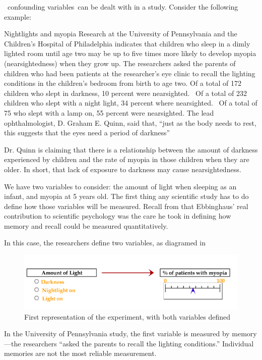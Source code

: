 \begin{refsection}
 confounding variables can be dealt with in a study. Consider the following example:

\begin{apatextbox}{Nightlights and myopia}
Research at the University of Pennsylvania and the Children’s Hospital of Philadelphia indicates that children who sleep in a dimly lighted room until age two may be up to five times more likely to develop myopia (nearsightedness) when they grow up.\newline
The researchers asked the parents of children who had been patients at the researcher’s eye clinic to recall the lighting conditions in the children’s bedroom from birth to age two.\newline
Of a total of 172 children who slept in darkness, 10 percent were nearsighted.  Of a total of 232 children who slept with a night light, 34 percent where nearsighted.  Of a total of 75 who slept with a lamp on, 55 percent were nearsighted.\newline
The lead ophthalmologist, D. Graham E. Quinn, said that, “just as the body needs to rest, this suggests that the eyes need a period of darkness” 
\end{apatextbox}

Dr. Quinn is claiming that there is a relationship between the amount of darkness experienced by children and the rate of myopia in those children when they are older. In short, that lack of exposure to darkness may cause nearsightedness.

We have two variables to consider: the amount of light when sleeping as an infant, and myopia at 5 years old. The first thing any scientific study has to do define how those variables will be measured. Recall from  that Ebbinghaus’ real contribution to scientific psychology was the care he took in defining how memory and recall could be measured quantitatively. 

In this case, the researchers define two variables, as diagramed in 
\begin{figure}\includegraphics{../images/hypothesis2.png}\caption{First representation of the experiment, with both variables defined}\label{fig:hypothesis2}\end{figure}
 In the University of Pennsylvania study, the first variable is measured by memory---the researchers “asked the parents to recall the lighting conditions.” Individual memories are not the most reliable measurement. 


\end{refsection}
